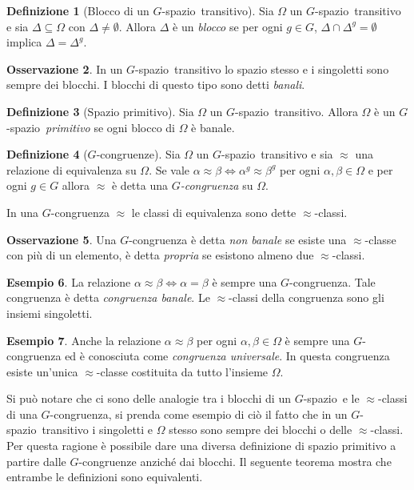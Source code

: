 \documentclass[12pt,a4paper,openright]{report}
\newcommand{\0}{\setminus\{0\}} %
\newcommand{\Gsp}{$G$-spazio~} %
\theoremstyle{definition}
\newtheorem{defn}{Definizione}[chapter]
\newtheorem{oss}[defn]{Osservazione}
\newtheorem{es}[defn]{Esempio}
\theoremstyle{plain}
\begin{document}
\begin{defn}[Blocco di un \Gsp transitivo]
Sia $\Omega$ un \Gsp transitivo e sia $\Delta \subseteq \Omega$ con $\Delta \neq \emptyset$. Allora $\Delta$ è un \emph{blocco} se per ogni $g \in G$, $\Delta \cap \Delta^g = \emptyset$ implica $\Delta=\Delta^g$.
\end{defn}
\begin{oss} 
In un \Gsp transitivo lo spazio stesso e i singoletti sono sempre dei blocchi. I blocchi di questo tipo sono detti \emph{banali}.
\end{oss}
\begin{defn} [Spazio primitivo]
Sia $\Omega$ un \Gsp transitivo. Allora $\Omega$ è un \Gsp \emph{primitivo} se ogni blocco di $\Omega$ è banale.
\end{defn}
\begin{defn} [$G$-congruenze]
    Sia $\Omega$ un \Gsp transitivo e sia $\approx$ una relazione di equivalenza su $\Omega$. Se vale $\alpha \approx \beta \Leftrightarrow \alpha^g \approx \beta^g$ per ogni $\alpha, \beta \in \Omega$ e per ogni $g \in G$ allora $\approx$ è detta una \emph{$G$-congruenza} su $\Omega$.
\end{defn}
In una $G$-congruenza $\approx$ le classi di equivalenza sono dette $\approx$-classi.
\begin{oss} 
    Una $G$-congruenza è detta \emph{non banale} se esiste una $\approx$-classe con più di un elemento, è detta \emph{propria} se esistono almeno due $\approx$-classi. 
\end{oss}
\begin{es}
    La relazione $\alpha \approx \beta \Leftrightarrow \alpha=\beta$ è sempre una $G$-congruenza. Tale congruenza è detta \emph{congruenza banale}. Le $\approx$-classi della congruenza sono gli insiemi singoletti.
\end{es}
\begin{es}
    Anche la relazione $\alpha \approx \beta$ per ogni $\alpha,\beta \in \Omega$ è sempre una $G$-congruenza ed è conosciuta come \emph{congruenza universale}. In questa congruenza esiste un'unica $\approx$-classe costituita da tutto l'insieme $\Omega$.
\end{es}
Si può notare che ci sono delle analogie tra i blocchi di un \Gsp e le $\approx$-classi di una $G$-congruenza, si prenda come esempio di ciò il fatto che in un \Gsp transitivo i singoletti e $\Omega$ stesso sono sempre dei blocchi o delle $\approx$-classi. Per questa ragione è possibile dare una diversa definizione di spazio primitivo a partire dalle $G$-congruenze anziché dai blocchi. Il seguente teorema mostra che entrambe le definizioni sono equivalenti.
\end{document}
